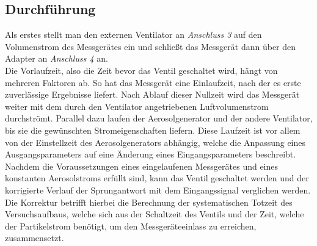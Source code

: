 \subsection{Durchf\"{u}hrung}
Als erstes stellt man den externen Ventilator an \textit{Anschluss 3} auf den Volumenstrom des Messger\"{a}tes ein und schlie{\ss}t das Messger\"{a}t dann \"{u}ber den Adapter an \textit{Anschluss 4} an.\\
Die Vorlaufzeit, also die Zeit bevor das Ventil geschaltet wird, h\"{a}ngt von mehreren Faktoren ab. So hat das Messger\"{a}t eine Einlaufzeit, nach der es erste zuverl\"{a}ssige Ergebnisse liefert. Nach Ablauf dieser Nullzeit wird das Messger\"{a}t weiter mit dem durch den Ventilator angetriebenen Luftvolumenstrom durchstr\"{o}mt. Parallel dazu laufen der Aerosolgenerator und der andere Ventilator, bis sie die gew\"{u}nschten Stromeigenschaften liefern. Diese Laufzeit ist vor allem von der Einstellzeit des Aerosolgenerators abh\"{a}ngig, welche die Anpassung eines Ausgangsparameters auf eine \"{A}nderung eines Eingangsparameters beschreibt. Nachdem die Voraussetzungen eines eingelaufenen Messger\"{a}tes und eines konstanten Aerosolstroms erf\"{u}llt sind, kann das Ventil geschaltet werden und der korrigierte Verlauf der Sprungantwort mit dem Eingangssignal verglichen werden. Die Korrektur betrifft hierbei die Berechnung der systematischen Totzeit des Versuchsaufbaus, welche sich aus der Schaltzeit des Ventils und der Zeit, welche der Partikelstrom ben\"{o}tigt, um den Messger\"{a}teeinlass zu erreichen, zusammensetzt.

